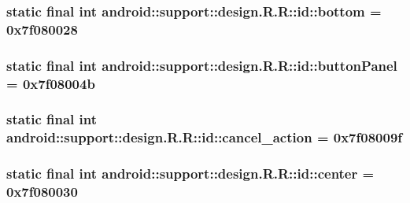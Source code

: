 \hypertarget{classandroid_1_1support_1_1design_1_1_r_1_1id_9311bcca501a35a9cc8fdb816f7be12b}{
\subsubsection[{bottom}]{\setlength{\rightskip}{0pt plus 5cm}static final int android::support::design.R.R::id::bottom = 0x7f080028}}
\label{classandroid_1_1support_1_1design_1_1_r_1_1id_9311bcca501a35a9cc8fdb816f7be12b}


\hypertarget{classandroid_1_1support_1_1design_1_1_r_1_1id_f078941cc97f33bb67758417fb67a9c6}{
\subsubsection[{buttonPanel}]{\setlength{\rightskip}{0pt plus 5cm}static final int android::support::design.R.R::id::buttonPanel = 0x7f08004b}}
\label{classandroid_1_1support_1_1design_1_1_r_1_1id_f078941cc97f33bb67758417fb67a9c6}


\hypertarget{classandroid_1_1support_1_1design_1_1_r_1_1id_4a09b4a3f2e2338833dff1cd8b19c92a}{
\subsubsection[{cancel\_\-action}]{\setlength{\rightskip}{0pt plus 5cm}static final int android::support::design.R.R::id::cancel\_\-action = 0x7f08009f}}
\label{classandroid_1_1support_1_1design_1_1_r_1_1id_4a09b4a3f2e2338833dff1cd8b19c92a}


\hypertarget{classandroid_1_1support_1_1design_1_1_r_1_1id_e35f11935ab62cc3d803b57987e1749f}{
\subsubsection[{center}]{\setlength{\rightskip}{0pt plus 5cm}static final int android::support::design.R.R::id::center = 0x7f080030}}
\label{classandroid_1_1support_1_1design_1_1_r_1_1id_e35f11935ab62cc3d803b57987e1749f}


